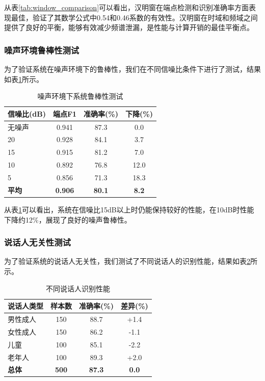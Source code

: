 \documentclass[sigconf,nonacm]{acmart}
\begin{document}
从表\ref{tab:window_comparison}可以看出，汉明窗在端点检测和识别准确率方面表现最佳，验证了其数学公式中0.54和0.46系数的有效性。汉明窗在时域和频域之间提供了良好的平衡，能够有效减少频谱泄漏，是性能与计算开销的最佳平衡点。

\subsubsection{噪声环境鲁棒性测试}

为了验证系统在噪声环境下的鲁棒性，我们在不同信噪比条件下进行了测试，结果如表\ref{tab:noise_robustness}所示。

\begin{table}[htbp]
\caption{噪声环境下系统鲁棒性测试}
\label{tab:noise_robustness}
\begin{center}
\begin{tabular}{lccc}
\toprule
\textbf{信噪比(dB)} & \textbf{端点F1} & \textbf{准确率(\%)} & \textbf{下降(\%)} \\
\midrule
无噪声 & 0.941 & 87.3 & 0.0 \\
20 & 0.928 & 84.1 & 3.7 \\
15 & 0.915 & 81.2 & 7.0 \\
10 & 0.892 & 76.8 & 12.0 \\
5 & 0.856 & 71.3 & 18.3 \\
\midrule
\textbf{平均} & \textbf{0.906} & \textbf{80.1} & \textbf{8.2} \\
\bottomrule
\end{tabular}
\end{center}
\end{table}

从表\ref{tab:noise_robustness}可以看出，系统在信噪比15dB以上时仍能保持较好的性能，在10dB时性能下降约12\%，展现了良好的噪声鲁棒性。

\subsubsection{说话人无关性测试}

为了验证系统的说话人无关性，我们测试了不同说话人的识别性能，结果如表\ref{tab:speaker_independence}所示。

\begin{table}[htbp]
\caption{不同说话人识别性能}
\label{tab:speaker_independence}
\begin{center}
\begin{tabular}{lccc}
\toprule
\textbf{说话人类型} & \textbf{样本数} & \textbf{准确率(\%)} & \textbf{差异(\%)} \\
\midrule
男性成人 & 150 & 88.7 & +1.4 \\
女性成人 & 150 & 86.2 & -1.1 \\
儿童 & 100 & 85.1 & -2.2 \\
老年人 & 100 & 89.3 & +2.0 \\
\midrule
\textbf{总体} & \textbf{500} & \textbf{87.3} & \textbf{0.0} \\
\bottomrule
\end{tabular}
\end{center}
\end{table}
\end{document}
